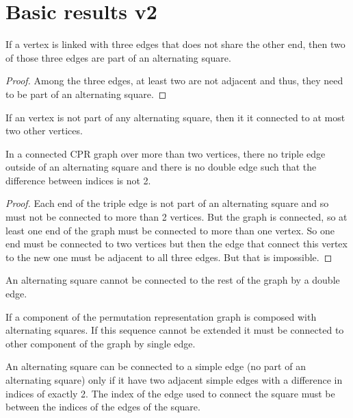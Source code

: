 \section{Basic results v2}

\begin{proposition}
  If a vertex is linked with three edges that does not share the other end, then two of those three edges are part of an alternating square.
\end{proposition}

\begin{proof}
  Among the three edges, at least two are not adjacent and thus, they need to be part of an alternating square.
\end{proof}

\begin{corollary}
  If an vertex is not part of any alternating square, then it it connected to at most two other vertices.
\end{corollary}

\begin{proposition}
  In a connected CPR graph over more than two vertices, there no triple edge outside of an alternating square and there is no double edge such that the difference between indices is not 2.
\end{proposition}

\begin{proof}
  Each end of the triple edge is not part of an alternating square and so must not be connected to more than 2 vertices. But the graph is connected, so at least one end of the graph must be connected to more than one vertex. So one end must be connected to two vertices but then the edge that connect this vertex to the new one must be adjacent to all three edges. But that is impossible.
\end{proof}

\begin{lemma}
  An alternating square cannot be connected to the rest of the graph by a double edge.
\end{lemma}

\begin{corollary}
  \label{sequence-connection}
  If a component of the permutation representation graph is composed with alternating squares. If this sequence cannot be extended it must be connected to other component of the graph by single edge.
\end{corollary}

\begin{proposition}
  \label{square-connection}
  An alternating square can be connected to a simple edge (no part of an alternating square) only if it have two adjacent simple edges with a difference in indices of exactly 2. The index of the edge used to connect the square must be between the indices of the edges of the square.
\end{proposition}

